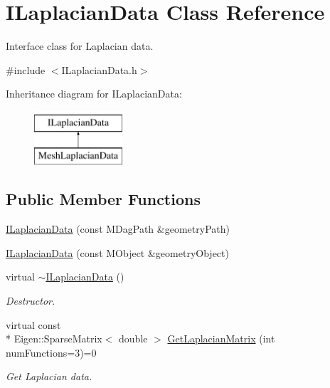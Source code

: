 \hypertarget{class_i_laplacian_data}{\section{I\+Laplacian\+Data Class Reference}
\label{class_i_laplacian_data}
}


Interface class for Laplacian data.  




{\ttfamily \#include $<$I\+Laplacian\+Data.\+h$>$}

Inheritance diagram for I\+Laplacian\+Data\+:\begin{figure}[H]
\begin{center}
\leavevmode
\includegraphics[height=2.000000cm]{class_i_laplacian_data}
\end{center}
\end{figure}
\subsection*{Public Member Functions}
\begin{DoxyCompactItemize}
\item 
\hyperlink{class_i_laplacian_data_a71e44bc645284129993f1563e199df2d}{I\+Laplacian\+Data} (const M\+Dag\+Path \&geometry\+Path)
\item 
\hyperlink{class_i_laplacian_data_a34b9877ebb8024d518dd0c47e48f99fa}{I\+Laplacian\+Data} (const M\+Object \&geometry\+Object)
\item 
\hypertarget{class_i_laplacian_data_a2664db9f1fefe4cbc8415ef9f90bfe60}{virtual \hyperlink{class_i_laplacian_data_a2664db9f1fefe4cbc8415ef9f90bfe60}{$\sim$\+I\+Laplacian\+Data} ()}\label{class_i_laplacian_data_a2664db9f1fefe4cbc8415ef9f90bfe60}

\begin{DoxyCompactList}\small\item\em Destructor. \end{DoxyCompactList}\item 
virtual const \\*
Eigen\+::\+Sparse\+Matrix$<$ double $>$ \hyperlink{class_i_laplacian_data_ae5d1999d7e077fae5e415ce811d71dba}{Get\+Laplacian\+Matrix} (int num\+Functions=3)=0
\begin{DoxyCompactList}\small\item\em Get Laplacian data. \end{DoxyCompactList}\end{DoxyCompactItemize}
